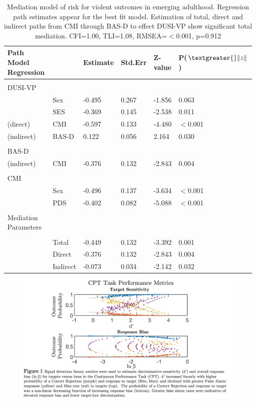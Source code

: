 \documentclass{article}%
\begin{document}
\begin{table}[h!]
\begin{tabular}{llllll}
Path Model Regression & & Estimate & Std.Err & Z-value & P($\textgreater{}\|z\|$) \\ \hline \\
DUSI-VP & & & & \\
& Sex  & -0.495    & 0.267   & -1.856   & 0.063 \\
& SES  & -0.369    & 0.145   & -2.538   & 0.011 \\
(direct) & CMI & -0.597    & 0.133   & -4.480   & $<$0.001 \\
(indirect) & BAS-D & 0.122    & 0.056   & 2.164   & 0.030 \\ \\
BAS-D & & & & \\
(indirect) & CMI  & -0.376    & 0.132   & -2.843   & 0.004 \\ \\
CMI & & & & \\
& Sex & -0.496    & 0.137   & -3.634   & $<$0.001 \\
& PDS  & -0.402    & 0.082   & -5.088   & $<$0.001 \\ \\
Mediation Parameters & & & & \\ \hline \\
& Total  & -0.449    & 0.132   & -3.392   & 0.001 \\
& Direct  & -0.376    & 0.132   & -2.843   & 0.004 \\
& Indirect  & -0.073    & 0.034   & -2.142   & 0.032 \\
\end{tabular}
\caption{Mediation model of risk for violent outcomes in emerging adulthood. Regression path estimates appear for the best fit model. Estimation of total, direct and indirect paths from CMI through BAS-D to effect DUSI-VP show significant total mediation. CFI=1.00, TLI=1.08, RMSEA=$<$0.001, p=0.912\label{tab:5}}
\end{table}
%
\clearpage
\begin{figure}[h!]
\includegraphics[width=\textwidth,height=\textheight,keepaspectratio]{Fig-1}
\caption{\label{fig:1}}
\end{figure}
\end{document}
